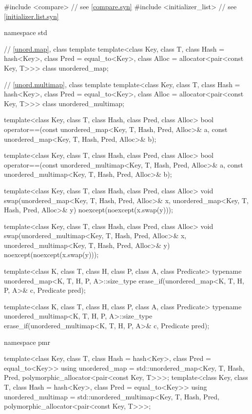 %
%
%
\begin{codeblock}
#include <compare>              // see \ref{compare.syn}
#include <initializer_list>     // see \ref{initializer.list.syn}

namespace std {
  // \ref{unord.map}, class template 
  template<class Key,
           class T,
           class Hash = hash<Key>,
           class Pred = equal_to<Key>,
           class Alloc = allocator<pair<const Key, T>>>
    class unordered_map;

  // \ref{unord.multimap}, class template 
  template<class Key,
           class T,
           class Hash = hash<Key>,
           class Pred = equal_to<Key>,
           class Alloc = allocator<pair<const Key, T>>>
    class unordered_multimap;

  template<class Key, class T, class Hash, class Pred, class Alloc>
    bool operator==(const unordered_map<Key, T, Hash, Pred, Alloc>& a,
                    const unordered_map<Key, T, Hash, Pred, Alloc>& b);

  template<class Key, class T, class Hash, class Pred, class Alloc>
    bool operator==(const unordered_multimap<Key, T, Hash, Pred, Alloc>& a,
                    const unordered_multimap<Key, T, Hash, Pred, Alloc>& b);

  template<class Key, class T, class Hash, class Pred, class Alloc>
    void swap(unordered_map<Key, T, Hash, Pred, Alloc>& x,
              unordered_map<Key, T, Hash, Pred, Alloc>& y)
      noexcept(noexcept(x.swap(y)));

  template<class Key, class T, class Hash, class Pred, class Alloc>
    void swap(unordered_multimap<Key, T, Hash, Pred, Alloc>& x,
              unordered_multimap<Key, T, Hash, Pred, Alloc>& y)
      noexcept(noexcept(x.swap(y)));

  template<class K, class T, class H, class P, class A, class Predicate>
    typename unordered_map<K, T, H, P, A>::size_type
      erase_if(unordered_map<K, T, H, P, A>& c, Predicate pred);

  template<class K, class T, class H, class P, class A, class Predicate>
    typename unordered_multimap<K, T, H, P, A>::size_type
      erase_if(unordered_multimap<K, T, H, P, A>& c, Predicate pred);

  namespace pmr {
    template<class Key,
             class T,
             class Hash = hash<Key>,
             class Pred = equal_to<Key>>
      using unordered_map =
        std::unordered_map<Key, T, Hash, Pred,
                           polymorphic_allocator<pair<const Key, T>>>;
    template<class Key,
             class T,
             class Hash = hash<Key>,
             class Pred = equal_to<Key>>
      using unordered_multimap =
        std::unordered_multimap<Key, T, Hash, Pred,
                                polymorphic_allocator<pair<const Key, T>>>;

  }
}
\end{codeblock}

